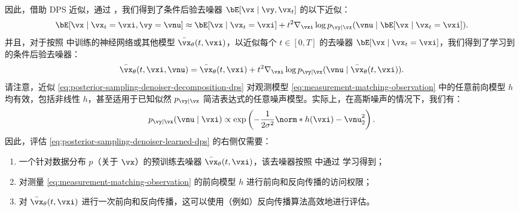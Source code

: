 \documentclass[../../book-main_zh.tex]{subfiles}
\begin{document}
因此，借助 DPS 近似，通过 ，我们得到了条件后验去噪器 $\bE[\vx \mid \vy, \vx_t]$ 的以下近似：
\begin{equation}
    \bE[ \vx \mid \vx_t=\vxi, \vy=\vnu]
    \approx
    \bE[\vx \mid \vx_t=\vxi]
    + t^2 \nabla_{\vxi} \log p_{\vy \mid \vx}(\vnu \mid \bE[\vx \mid
    \vx_t = \vxi]).
    \label{eq:posterior-sampling-denoiser-decomposition-dps}
\end{equation}
并且，对于按照  中训练的神经网络或其他模型 $\bar{\vx}_{\theta}(t, \vxi)$，以近似每个 $t \in [0, T]$ 的去噪器 $\bE[\vx \mid \vx_t = \vxi]$，我们得到了学习到的条件后验去噪器：
\begin{equation}
    \bar{\vx}_{\theta}(t, \vxi, \vnu)
    = \bar{\vx}_{\theta}(t, \vxi)
    + t^2 \nabla_{\vxi} \log p_{\vy \mid \vx}(\vnu \mid \bar{\vx}_{\theta}(t,
    \vxi)).
    \label{eq:posterior-sampling-denoiser-learned-dps}
\end{equation}
请注意，近似 \eqref{eq:posterior-sampling-denoiser-decomposition-dps} 对观测模型 \eqref{eq:measurement-matching-observation} 中的任意前向模型 $h$ 均有效，包括非线性 $h$，甚至适用于已知似然 $p_{\vy \mid \vx}$ 简洁表达式的任意噪声模型。实际上，在高斯噪声的情况下，我们有：
\begin{equation}
    p_{\vy \mid \vx}(\vnu \mid \vxi)
    \propto
    \exp\left(
        -\frac{1}{2\sigma^2} \norm*{ h(\vxi) - \vnu }_2^2
    \right).
\end{equation}
因此，评估 \eqref{eq:posterior-sampling-denoiser-learned-dps} 的右侧仅需要：
\begin{enumerate}
    \item 一个针对数据分布 $p$（关于 $\vx$）的预训练去噪器 $\bar{\vx}_{\theta}(t, \vxi)$，该去噪器按照  中通过  学习得到；
    \item 对测量 \eqref{eq:measurement-matching-observation} 的前向模型 $h$ 进行前向和反向传播的访问权限；
    \item 对 $\bar{\vx}_{\theta}(t, \vxi)$ 进行一次前向和反向传播，这可以使用（例如）反向传播算法高效地进行评估。
\end{enumerate}
\end{document}
